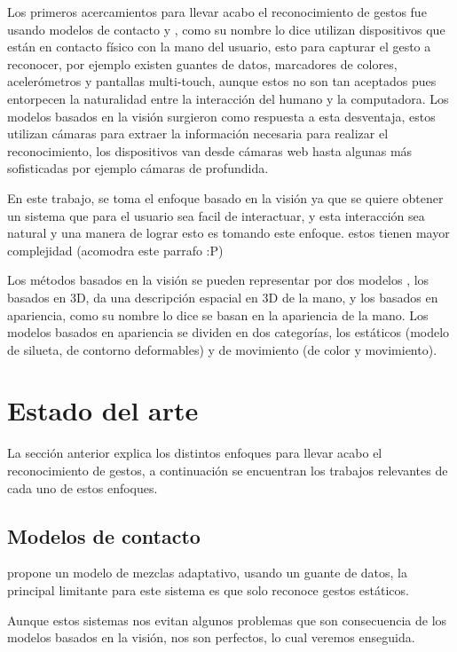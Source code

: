 Los primeros acercamientos para llevar acabo el reconocimiento de gestos fue usando modelos de contacto \citep{Rautaray2012} y \citep{Nayakwadi2014}, como su nombre lo dice utilizan dispositivos que est\'an en contacto f\'isico con la mano del usuario, esto para capturar el gesto a reconocer, por ejemplo existen guantes de datos, marcadores de colores, acelerómetros y pantallas multi-touch, aunque estos no son tan aceptados pues entorpecen la naturalidad entre la interacción del humano y la computadora. Los modelos basados en la visi\'on surgieron como respuesta a esta desventaja, estos utilizan cámaras para extraer la información necesaria para realizar el reconocimiento, los dispositivos van desde c\'amaras web hasta algunas más sofisticadas por ejemplo c\'amaras de profundida.  

En este trabajo, se toma el enfoque basado en la visi\'on ya que se quiere obtener un sistema que para el usuario sea facil de interactuar, y esta interacci\'on sea natural y una manera de lograr esto es tomando este enfoque.  estos tienen mayor complejidad (acomodra este parrafo :P)


Los métodos basados en la visión se pueden representar por dos modelos \citep{Rautaray2012}, los basados en 3D, da una descripción espacial en 3D de la mano, y los basados en apariencia, como su nombre lo dice se basan en la apariencia de la mano. Los modelos basados en apariencia se dividen en dos categorías, los estáticos (modelo de silueta, de contorno deformables) y de movimiento (de color y movimiento).


\section{Estado del arte}\label{sec:EstadoDelArte} 

La sección anterior explica los distintos enfoques para llevar acabo el reconocimiento de gestos, a continuación se encuentran los trabajos relevantes de cada uno de estos enfoques. 

\subsection{Modelos de contacto}

\citep{Yoon2012} propone un modelo de mezclas adaptativo, usando un guante de datos, la principal limitante para este sistema es que solo reconoce gestos estáticos. 

Aunque estos sistemas nos evitan algunos problemas que son consecuencia de los modelos basados en la visión, nos son perfectos, lo cual veremos enseguida.  

